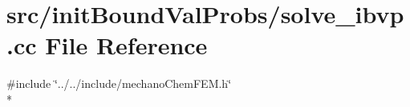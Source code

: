 \section{src/init\-Bound\-Val\-Probs/solve\-\_\-ibvp.cc File Reference}
\label{solve__ibvp_8cc}
{\ttfamily \#include \char`\"{}../../include/mechano\-Chem\-F\-E\-M.\-h\char`\"{}}\\*
